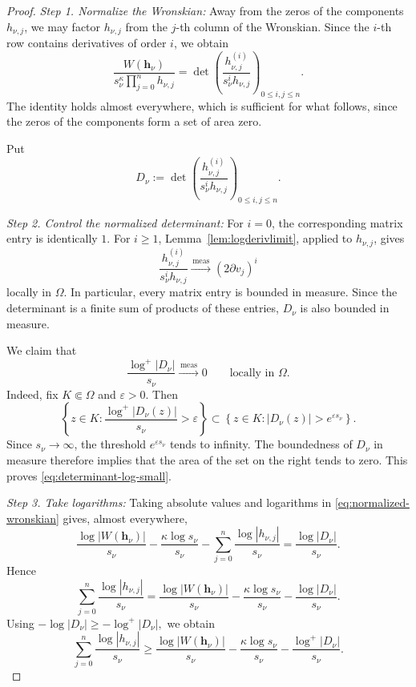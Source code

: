 \documentclass[12pt,letterpaper,reqno]{amsart}
\theoremstyle{definition}
\numberwithin{equation}{section}
\newcommand{\convmeas}{\xrightarrow{\,\mathrm{meas}\,}}
\newcommand{\hv}{\bm h}
\begin{document}
\begin{proof}

\medskip\noindent
\emph{{Step 1. Normalize the Wronskian:}}
Away from the zeros of the components \(h_{\nu,j}\), we may factor
\(h_{\nu,j}\) from the \(j\)-th column of the Wronskian. Since the
\(i\)-th row contains derivatives of order \(i\), we obtain
\begin{equation}\label{eq:normalized-wronskian}
 \frac{W(\hv_\nu)}
 {s_\nu^\kappa\prod_{j=0}^{n}h_{\nu,j}}
 =
 \det\left(
 \frac{h_{\nu,j}^{(i)}}
 {s_\nu^ih_{\nu,j}}
 \right)_{0\leq i,j\le n}.
\end{equation}
The identity holds almost everywhere, which is sufficient for what follows,
since the zeros of the components form a set of area zero.

Put
\[
D_\nu:=
\det\left(
 \frac{h_{\nu,j}^{(i)}}
 {s_\nu^ih_{\nu,j}}
 \right)_{0\leq i,j\le n}.
\]

\medskip\noindent
\emph{{Step 2. Control the normalized determinant:}}
For \(i=0\), the corresponding matrix entry is identically \(1\). For
\(i\geq1\), Lemma~\ref{lem:logderivlimit}, applied to
\(h_{\nu,j}\), gives
\[
 \frac{h_{\nu,j}^{(i)}}
 {s_\nu^ih_{\nu,j}}
 \convmeas
 (2\partial v_j)^i
\]
locally in \(\Omega\). In particular, every matrix entry is bounded in
measure. Since the determinant is a finite sum of products of these
entries, \(D_\nu\) is also bounded in measure.

We claim that
\begin{equation}\label{eq:determinant-log-small}
 \frac{\log^+|D_\nu|}{s_\nu}
 \convmeas0
 \qquad\text{locally in }\Omega.
\end{equation}
Indeed, fix \(K\Subset\Omega\) and \(\varepsilon>0\). Then
\[
 \left\{
 z\in K:
 \frac{\log^+|D_\nu(z)|}{s_\nu}>\varepsilon
 \right\}
 \subset
 \left\{
 z\in K:
 |D_\nu(z)|>e^{\varepsilon s_\nu}
 \right\}.
\]
Since \(s_\nu\to\infty\), the threshold \(e^{\varepsilon s_\nu}\) tends
to infinity. The boundedness of \(D_\nu\) in measure therefore implies
that the area of the set on the right tends to zero. This proves
\eqref{eq:determinant-log-small}.

\medskip\noindent
\emph{{Step 3. Take logarithms:}}
Taking absolute values and logarithms in
\eqref{eq:normalized-wronskian} gives, almost everywhere,
\[
 \frac{\log|W(\hv_\nu)|}{s_\nu}
 -
 \frac{\kappa\log s_\nu}{s_\nu}
 -
 \sum_{j=0}^{n}
 \frac{\log|h_{\nu,j}|}{s_\nu}
 =
 \frac{\log|D_\nu|}{s_\nu}.
\]
Hence
\[
 \sum_{j=0}^{n}
 \frac{\log|h_{\nu,j}|}{s_\nu}
 =
 \frac{\log|W(\hv_\nu)|}{s_\nu}
 -
 \frac{\kappa\log s_\nu}{s_\nu}
 -
 \frac{\log|D_\nu|}{s_\nu}.
\]
Using $
-\log|D_\nu|\geq-\log^+|D_\nu|,
$
we obtain
\begin{equation}\label{eq:wronskian-lower-bound}
 \sum_{j=0}^{n}
 \frac{\log|h_{\nu,j}|}{s_\nu}
 \geq
 \frac{\log|W(\hv_\nu)|}{s_\nu}
 -
 \frac{\kappa\log s_\nu}{s_\nu}
 -
 \frac{\log^+|D_\nu|}{s_\nu}.
\end{equation}


\end{proof}
\end{document}
